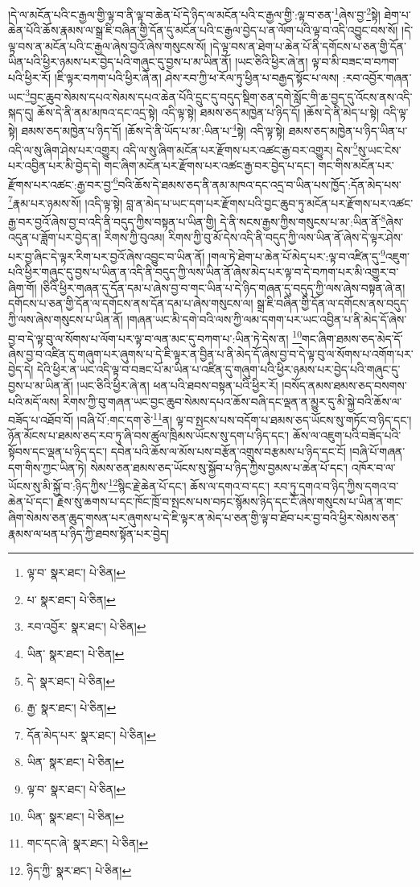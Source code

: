 །དེ་ལ་མངོན་པའི་ང་རྒྱལ་གྱི་ལྟ་བ་ནི་ལྟ་བ་ཆེན་པོ་དེ་ཉིད་ལ་མངོན་པའི་ང་རྒྱལ་གྱི་:ལྟ་བ་ཅན་\footnote{ལྟ་བ་  སྣར་ཐང་།  པེ་ཅིན། }ཞེས་བྱ་\footnote{པ་  སྣར་ཐང་།  པེ་ཅིན། }སྟེ། ཐེག་པ་ཆེན་པོའི་ཆོས་རྣམས་ལ་སྒྲ་ཇི་བཞིན་གྱི་དོན་དུ་མངོན་པའི་ང་རྒྱལ་བྱེད་པ་ན་ལོག་པའི་ལྟ་བ་འདི་འབྱུང་བས་སོ། །དེ་ལྟ་བས་ན་མངོན་པའི་ང་རྒྱལ་ཞེས་བྱའོ་ཞེས་གསུངས་སོ། །དེ་ལྟ་བས་ན་ཐེག་པ་ཆེན་པོ་ནི་དགོངས་པ་ཅན་གྱི་དོན་ཡིན་པའི་ཕྱིར་ཉམས་པར་བྱེད་པའི་གཞུང་དུ་བྱས་པ་མ་ཡིན་ནོ། །ཡང་ཅིའི་ཕྱིར་ཞེ་ན། ལྟ་བ་མི་བཟང་བ་བཀག་པའི་ཕྱིར་རོ། །ཇི་ལྟར་བཀག་པའི་ཕྱིར་ཞེ་ན། ཤེས་རབ་ཀྱི་ཕ་རོལ་ཏུ་ཕྱིན་པ་བརྒྱད་སྟོང་པ་ལས། :རབ་འབྱོར་གཞན་ཡང་\footnote{རབ་འབྱོར་  སྣར་ཐང་།  པེ་ཅིན། }བྱང་ཆུབ་སེམས་དཔའ་སེམས་དཔའ་ཆེན་པོའི་དྲུང་དུ་བདུད་སྡིག་ཅན་དགེ་སློང་གི་ཆ་བྱད་དུ་འོངས་ནས་འདི་སྐད་དུ། ཆོས་དེ་ནི་ནམ་མཁའ་དང་འདྲ་སྟེ། འདི་ལྟ་སྟེ། ཐམས་ཅད་མཁྱེན་པ་ཉིད་དོ། །ཆོས་དེ་ནི་མེད་པ་སྟེ། འདི་ལྟ་སྟེ། ཐམས་ཅད་མཁྱེན་པ་ཉིད་དོ། །ཆོས་དེ་ནི་ཡོད་པ་མ་:ཡིན་པ་\footnote{ཡིན་  སྣར་ཐང་།  པེ་ཅིན། }སྟེ། འདི་ལྟ་སྟེ། ཐམས་ཅད་མཁྱེན་པ་ཉིད་ཡིན་པ་འདི་ལ་སུ་ཞིག་ཤེས་པར་འགྱུར། འདི་ལ་སུ་ཞིག་མངོན་པར་རྫོགས་པར་འཚང་རྒྱ་བར་འགྱུར། དེས་\footnote{དེ་  སྣར་ཐང་།  པེ་ཅིན། }སུ་ཡང་ངེས་པར་འབྱིན་པར་མི་བྱེད་དེ། གང་ཞིག་མངོན་པར་རྫོགས་པར་འཚང་རྒྱ་བར་བྱེད་པ་དང་། གང་གིས་མངོན་པར་རྫོགས་པར་འཚང་:རྒྱ་བར་བྱ་\footnote{རྒྱ་  སྣར་ཐང་།  པེ་ཅིན། }བའི་ཆོས་དེ་ཐམས་ཅད་ནི་ནམ་མཁའ་དང་འདྲ་བ་ཡིན་པས་ཁྱོད་:དོན་མེད་པས་\footnote{དོན་མེད་པར་  སྣར་ཐང་།  པེ་ཅིན། }རྣམ་པར་ཉམས་སོ། །འདི་ལྟ་སྟེ། བླ་ན་མེད་པ་ཡང་དག་པར་རྫོགས་པའི་བྱང་ཆུབ་ཏུ་མངོན་པར་རྫོགས་པར་འཚང་རྒྱ་བར་བྱའོ་ཞེས་བྱ་བ་འདི་ནི་བདུད་ཀྱིས་བསྟན་པ་ཡིན་གྱི། དེ་ནི་སངས་རྒྱས་ཀྱིས་གསུངས་པ་མ་:ཡིན་ནོ་\footnote{ཡིན་  སྣར་ཐང་།  པེ་ཅིན། }ཞེས་འདུན་པ་ཟློག་པར་བྱེད་ན། རིགས་ཀྱི་བུའམ། རིགས་ཀྱི་བུ་མོ་དེས་འདི་ནི་བདུད་ཀྱི་ལས་ཡིན་ནོ་ཞེས་དེ་ལྟར་ཤེས་པར་བྱ་ཞིང་དེ་ལྟར་རིག་པར་བྱའོ་ཞེས་འབྱུང་བ་ཡིན་ནོ། །གལ་ཏེ་ཐེག་པ་ཆེན་པོ་མེད་པར་:ལྟ་བ་འཛིན་དུ་\footnote{ལྟ་བ་  སྣར་ཐང་།  པེ་ཅིན། }འཇུག་པའི་ཕྱིར་གཞུང་དུ་བྱས་པ་ཡིན་ན་འདི་ནི་བདུད་ཀྱི་ལས་ཡིན་ནོ་ཞེས་མེད་པར་ལྟ་བ་དེ་བཀག་པར་མི་འགྱུར་བ་ཞིག་གོ། །ཅིའི་ཕྱིར་གཞན་དུ་དོན་དམ་པ་ཞེས་བྱ་བ་གང་ཡིན་པ་དེ་ཉིད་གཞན་དུ་བདུད་ཀྱི་ལས་ཞེས་བསྟན་ཞེ་ན། དགོངས་པ་ཅན་གྱི་དོན་ལ་དགོངས་ནས་དོན་དམ་པ་ཞེས་གསུངས་ལ། སྒྲ་ཇི་བཞིན་གྱི་དོན་ལ་དགོངས་ནས་བདུད་ཀྱི་ལས་ཞེས་གསུངས་པ་ཡིན་ནོ། །གཞན་ཡང་མི་དགེ་བའི་ལས་ཀྱི་ལམ་དགག་པར་ཡང་འབྱིན་པ་ནི་མེད་དོ་ཞེས་བྱ་བ་དེ་ལྟ་བུ་ལ་སོགས་པ་ལོག་པར་ལྟ་བ་ལན་མང་དུ་བཀག་པ་:ཡིན་ཏེ་དེས་ན། \footnote{ཡིན་  སྣར་ཐང་།  པེ་ཅིན། }གང་ཞིག་ཐམས་ཅད་མེད་དོ་ཞེས་བྱ་བ་འཛིན་དུ་གཞུག་པར་ཞུགས་པ་དེ་ཇི་ལྟར་ན་བྱིན་པ་ནི་མེད་དོ་ཞེས་བྱ་བ་དེ་ལྟ་བུ་ལ་སོགས་པ་འགོག་པར་བྱེད་དེ། དེའི་ཕྱིར་ན་ཡང་འདི་ལྟ་བ་བཟང་པོ་མ་ཡིན་པ་འཛིན་དུ་གཞུག་པའི་ཕྱིར་ཉམས་པར་བྱེད་པའི་གཞུང་དུ་བྱས་པ་མ་ཡིན་ནོ། །ཡང་ཅིའི་ཕྱིར་ཞེ་ན། ཕན་པའི་ཐབས་བསྟན་པའི་ཕྱིར་རོ། །བསོད་ནམས་ཐམས་ཅད་བསགས་པའི་མདོ་ལས། རིགས་ཀྱི་བུ་གཞན་ཡང་བྱང་ཆུབ་སེམས་དཔའ་ཆོས་བཞི་དང་ལྡན་ན་མྱུར་དུ་མི་སྐྱེ་བའི་ཆོས་ལ་བཟོད་པ་འཐོབ་བོ། །བཞི་པོ་:གང་དག་ཅེ་\footnote{གང་དང་ཞེ་  སྣར་ཐང་།  པེ་ཅིན། }ན། ལྟ་བ་སྤངས་པས་བདོག་པ་ཐམས་ཅད་ཡོངས་སུ་གཏོང་བ་ཉིད་དང་། ཉོན་མོངས་པ་ཐམས་ཅད་རབ་ཏུ་ཞི་བས་ཚུལ་ཁྲིམས་ཡོངས་སུ་དག་པ་ཉིད་དང་། ཆོས་ལ་འཇུག་པའི་བཟོད་པའི་སྟོབས་དང་ལྡན་པ་ཉིད་དང་། དབེན་པའི་ཆོས་ལ་མོས་པས་བརྩོན་འགྲུས་བརྩམས་པ་ཉིད་དང་ངོ། །བཞི་པོ་གཞན་དག་གིས་ཀྱང་ཡིན་ཏེ། སེམས་ཅན་ཐམས་ཅད་ཡོངས་སུ་སྐྱོབ་པ་ཉིད་ཀྱིས་བྱམས་པ་ཆེན་པོ་དང་། འཁོར་བ་ལ་ཡོངས་སུ་མི་སྐྱོ་བ་:ཉིད་ཀྱིས་\footnote{ཉིད་ཀྱི་  སྣར་ཐང་།  པེ་ཅིན། }སྙིང་རྗེ་ཆེན་པོ་དང་། ཆོས་ལ་དགའ་བ་དང་། རབ་ཏུ་དགའ་བ་ཉིད་ཀྱིས་དགའ་བ་ཆེན་པོ་དང་། རྗེས་སུ་ཆགས་པ་དང་ཁོང་ཁྲོ་བ་སྤངས་པས་བཏང་སྙོམས་ཉིད་དང་ངོ་ཞེས་གསུངས་པ་ཡིན་ན་གང་ཞིག་སེམས་ཅན་ཆུད་གསན་པར་ཞུགས་པ་དེ་ཇི་ལྟར་ན་མེད་པ་ཅན་གྱི་ལྟ་བ་ཐོབ་པར་བྱ་བའི་ཕྱིར་སེམས་ཅན་རྣམས་ལ་ཕན་པ་ཉིད་ཀྱི་ཐབས་སྟོན་པར་བྱེད། 